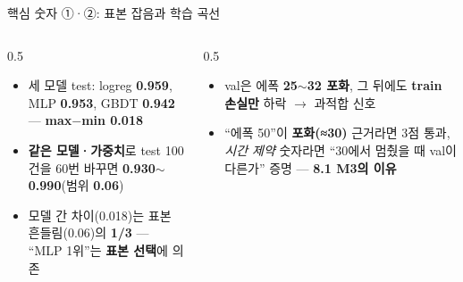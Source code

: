 \begin{frame}{핵심 숫자 ①·②: 표본 잡음과 학습 곡선}
  \small
  \begin{columns}[T]
    \begin{column}{0.5\textwidth}
      \begin{itemize}
        \item 세 모델 test: logreg \textbf{0.959}, MLP
          \textbf{0.953}, GBDT \textbf{0.942} —
          \textbf{max$-$min 0.018}
        \item \textbf{같은 모델·가중치}로 test 100건을 60번
          바꾸면 \textbf{0.930$\sim$0.990}(범위 \textbf{0.06})
        \item 모델 간 차이(0.018)는 표본 흔들림(0.06)의
          \textbf{1/3} — ``MLP 1위''는 \textbf{표본 선택}에
          의존
      \end{itemize}
    \end{column}
    \begin{column}{0.5\textwidth}
      \begin{itemize}
        \item val은 에폭 \textbf{25$\sim$32 포화}, 그 뒤에도
          \textbf{train 손실만} 하락 $\to$ 과적합 신호
        \item ``에폭 50''이 \textbf{포화(≈30)} 근거라면 3점
          통과, \textit{시간 제약} 숫자라면 ``30에서 멈췄을
          때 val이 다른가'' 증명 — \textbf{8.1 M3의 이유}
      \end{itemize}
    \end{column}
  \end{columns}
\end{frame}
